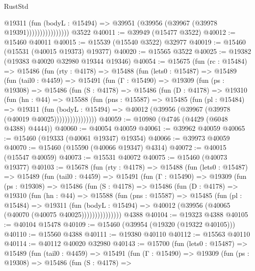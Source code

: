 \begin{lexlean}{RustStd}
\begin{coremodule}
                          @19311
                            (fun (bodyL : @15494) =>
                            @39951 (@39956 (@39967 (@39978 @19391))))))))))))))))
    @3522
@40011 := @39949 (@15477 @3522)
@40012 := @15460 @40011
@40015 := @15539 (@15540 @3522) @32977
@40019 := @15460 (@15531 (@40015 @19373) @19377)
@40020 := @15565 @3522
@40025 := @19382 (@19383 @40020 @32980 @19344 @19346)
@40054 := @15675
    (fun (rc : @15484) =>
    @15486
      (fun (rty : @4178) =>
      @15488
        (fun (lets0 : @15487) =>
        @15489
          (fun (tail0 : @4459) =>
          @15491
            (fun (Γ : @15490) =>
            @19309
              (fun (ps : @19308) =>
              @15486
                (fun (S : @4178) =>
                @15486
                  (fun (D : @4178) =>
                  @19310
                    (fun (hn : @44) =>
                    @15588
                      (fun (pns : @15587) =>
                      @15485
                        (fun (pl : @15484) =>
                        @19311
                          (fun (bodyL : @15494) =>
                          @40012 (@39956 (@39967 (@39978 (@40019 @40025))))))))))))))))
@40059 := @10980 (@4746 (@4429 (@6048 @4388) @4444))
@40060 := @40054 @40059
@40061 := @39962 @40059
@40065 := @15460 (@19333 (@40061 @19347) @19354)
@40066 := @39973 @40059
@40070 := @15460 (@15590 (@40066 @19347) @4314)
@40072 := @40015 (@15547 @40059)
@40073 := @15531 @40072
@40075 := @15460 (@40073 @19377)
@40103 := @15678
    (fun (rty : @4178) =>
    @15488
      (fun (lets0 : @15487) =>
      @15489
        (fun (tail0 : @4459) =>
        @15491
          (fun (Γ : @15490) =>
          @19309
            (fun (ps : @19308) =>
            @15486
              (fun (S : @4178) =>
              @15486
                (fun (D : @4178) =>
                @19310
                  (fun (hn : @44) =>
                  @15588
                    (fun (pns : @15587) =>
                    @15485
                      (fun (pl : @15484) =>
                      @19311
                        (fun (bodyL : @15494) =>
                        @40012 (@39956 (@40065 (@40070 (@40075 @40025)))))))))))))))
    @4388
@40104 := @19323 @4388
@40105 := @40104 @15478
@40109 := @15460 (@39954 (@19320 (@19322 @40105)))
@40110 := @15560 @4388
@40111 := @19380 @40110
@40112 := @15563 @40110
@40114 := @40112 @40020 @32980
@40143 := @15700
    (fun (lets0 : @15487) =>
    @15489
      (fun (tail0 : @4459) =>
      @15491
        (fun (Γ : @15490) =>
        @19309
          (fun (ps : @19308) =>
          @15486
            (fun (S : @4178) =>

\end{coremodule}
\end{lexlean}
